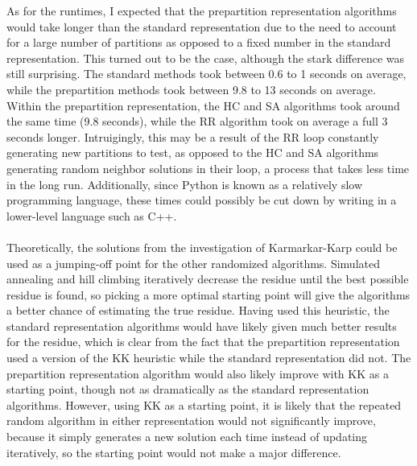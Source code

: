 \documentclass[11pt]{article}
\begin{document}
As for the runtimes, I expected that the prepartition representation algorithms would take longer than the standard representation due to the need to account for a large number of partitions as opposed to a fixed number in the standard representation. This turned out to be the case, although the stark difference was still surprising. The standard methods took between 0.6 to 1 seconds on average, while the prepartition methods took between 9.8 to 13 seconds on average. Within the prepartition
representation, the HC and SA algorithms took around the same time (9.8 seconds), while the RR algorithm took on average a full 3 seconds longer. Intruigingly, this may be a result of the RR loop constantly generating new partitions to test, as opposed to the HC and SA algorithms generating random neighbor solutions in their loop, a process that takes less time in the long run. Additionally, since Python is known as a relatively slow programming language, these times could possibly be cut down by writing in a lower-level language such as C++. \\\\

Theoretically, the solutions from the investigation of Karmarkar-Karp could be used as a jumping-off point for the other randomized algorithms. Simulated annealing and hill climbing iteratively decrease the residue until the best possible residue is found, so picking a more optimal starting point will give the algorithms a better chance of estimating the true residue. Having used this heuristic, the standard representation algorithms would have likely given much better results for the residue, which is clear from the fact that the prepartition representation used a version of the KK heuristic while the standard representation did not. The prepartition representation algorithm would also likely improve with KK as a starting point, though not as dramatically as the standard representation algorithms. However, using KK as a starting point, it is likely that the repeated random algorithm in either representation would not significantly improve, because it simply generates a new solution each time instead of updating iteratively, so the starting point would not make a major difference.
\end{document}
